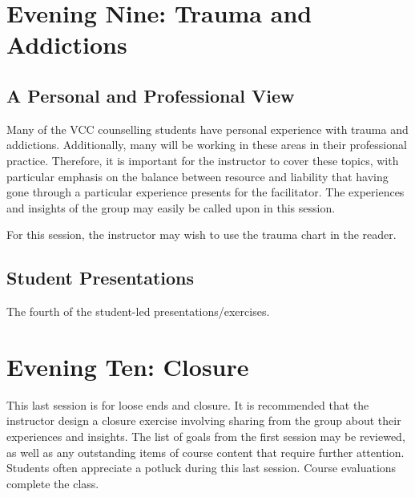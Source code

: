 \documentclass[12pt,DIV7,oneside,tocindent,headsepline]{scrbook}
\begin{document}
\section{Evening Nine: Trauma and Addictions}  

\subsection{A Personal and Professional View}


Many of the VCC counselling students have personal experience with trauma and addictions. Additionally, many will be working in these areas in their professional practice. Therefore, it is important for the instructor to cover these topics, with particular emphasis on the balance between resource and liability that having gone through a particular experience presents for the facilitator.  The experiences and insights of the group may easily be called upon in this session.

For this session, the instructor may wish to use the trauma chart in the reader.

\subsection{Student Presentations}  
The fourth of the student-led presentations/exercises.

\section{Evening Ten: Closure}  
This last session is for loose ends and closure. It is recommended that the instructor design a closure exercise involving sharing from the group about their experiences and insights. The list of goals from the first session may be reviewed, as well as any outstanding items of course content that require further attention.  Students often appreciate a potluck during this last session. Course evaluations complete the class.  
\end{document}
